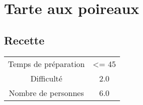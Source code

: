 \newpage
\section{Tarte aux poireaux}
    \label{sec:Tarte aux poireaux}
    \subsection{Recette}
    \vspace{1cm}


    \begin{center}
        \begin{tabular}{c|c}
            Temps de préparation & <= 45 \\
            Difficulté & 2.0 \\
            Nombre de personnes & 6.0 
        \end{tabular}
    \end{center}{}

    \vspace{1cm}
    \hline
    \vspace{1cm}


